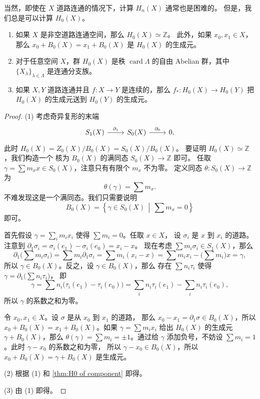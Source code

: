 \documentclass[fontset=none]{Notes}
\DeclareMathOperator\card{card}
\begin{document}
当然，即使在 $X$ 道路连通的情况下，计算 $H_n(X)$ 通常也是困难的。
但是，我们总是可以计算 $H_0(X)$。

\begin{theorem}
  \mbox{}
  \begin{enumerate}
    \item 如果 $X$ 是非空道路连通空间，那么 $H_0(X)\simeq \mathbb{Z}$。
    此外，如果 $x_0,x_1\in X$，那么 $x_0+B_0(X)=x_1+B_0(X)$ 
    是 $H_0(X)$ 的生成元。
    \item 对于任意空间 $X$，群 $H_0(X)$ 是秩 $\card\Lambda$ 的自由
    Abelian 群，其中 $\{X_\lambda\}_{\lambda\in \Lambda}$
    是连通分支族。
    \item 如果 $X,Y$ 道路连通并且 $f:X\to Y$ 是连续的，那么
    $f_*:H_0(X)\to H_0(Y)$ 把 $H_0(X)$ 的生成元送到 $H_0(Y)$ 的生成元。
  \end{enumerate}
\end{theorem}
\begin{proof}
  (1) 考虑奇异复形的末端
  \[
    \begin{tikzcd}
      S_1(X)\arrow[r,"\partial_1"] & S_0(X)\arrow[r,"\partial_0"] & 0,
    \end{tikzcd}
  \]
  此时 $H_0(X)=Z_0(X)/B_0(X)=S_0(X)/B_0(X)$。
  要证明 $H_0(X)\simeq \mathbb{Z}$，我们构造一个
  核为 $B_0(X)$ 的满同态 $S_0(X)\to \mathbb{Z}$ 即可。
  任取 $\gamma=\sum m_xx\in S_0(X)$，注意只有有限个 $m_x$ 不为零。
  定义同态 $\theta:S_0(X)\to \mathbb{Z}$ 为
  \[
    \theta(\gamma)=\sum m_x.
  \]
  不难发现这是一个满同态。我们只需要说明
  \[
    B_0(X)=\left\{\gamma\in S_0(X)\,\middle|\, \sum m_x=0\right\}
  \]
  即可。

  首先假设 $\gamma=\sum_i m_i x_i$ 使得 $\sum m_i=0$。任取 $x\in X$，
  设 $\sigma_i$ 是 $x$ 到 $x_i$ 的道路。注意到 $\partial_1\sigma_i=\sigma_i(e_1)-\sigma_i(e_0)=x_i-x$。
  现在考虑 $\sum m_i\sigma_i\in S_1(X)$，那么 
  \[
    \partial_1\bigl(\sum m_i\sigma_i\bigr)
    =\sum m_i\partial_1\sigma_i=\sum m_i(x_i-x)=
    \sum m_ix_i-\bigl(\sum m_i\bigr)x=\gamma,
  \]
  所以 $\gamma\in B_0(X)$。反之，设 $\gamma\in B_0(X)$，那么
  存在 $\sum n_i\tau_i$ 使得 $\gamma=\partial_1\bigl(\sum n_i\tau_i\bigr)$，
  即
  \[
    \gamma=\sum n_i\bigl(\tau_i(e_1)-\tau_i(e_0)\bigr)=
    \sum_i n_i\tau_i(e_1)-\sum_i n_i\tau_i(e_0),
  \]
  所以 $\gamma$ 的系数之和为零。

  令 $x_0,x_1\in X$。设 $\sigma$ 是从 $x_0$ 到 $x_1$ 的道路，
  那么 $x_0-x_1=\partial_1\sigma\in B_0(X)$，所以
  $x_0+B_0(X)=x_1+B_0(X)$。如果 $\gamma=\sum m_ix_i$ 给出 $H_0(X)$
  的生成元 $\gamma+B_0(X)$，那么 $\theta(\gamma)=\sum m_i=\pm 1$。通过给 $\gamma$
  添加负号，不妨设 $\sum m_i=1$。此时 $\gamma-x_0$ 的系数之和为零，
  所以 $\gamma-x_0\in B_0(X)$，所以 $x_0+B_0(X)=\gamma+B_0(X)$ 是生成元。

  (2) 根据 (1) 和 \autoref{thm:H0 of component} 即得。

  (3) 由 (1) 即得。
\end{proof}
\end{document}
